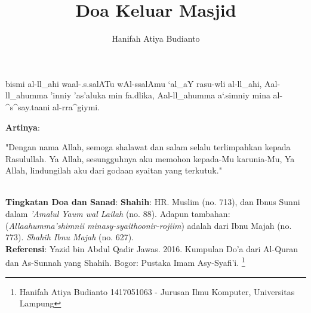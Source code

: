 \documentclass[a4paper,12pt]{article}
\title{\Large Doa Keluar Masjid}
\author{\calligra Hanifah Atiya Budianto}
\begin{document}
\sffamily
\maketitle 
\fullvocalize
{}
\begin{arabtext}
\noindent
bismi al-ll_ahi waal-.s.salATu wAl-ssalAmu `al_aY rasu-wli  al-ll_ahi, 
Aal-ll_ahumma 'inniy 'as'aluka min fa.dlika, Aal-ll_ahumma a`.simniy mina 
al-^s^say.taani al-rra^giymi.\\
\end{arabtext}
\noindent
\textbf{Artinya}:
\par
\indent
"Dengan nama Allah, semoga shalawat dan salam selalu terlimpahkan kepada 
Rasulullah. Ya Allah, sesungguhnya aku memohon kepada-Mu karunia-Mu, Ya 
Allah, lindungilah aku dari godaan syaitan yang terkutuk."\\\\
\par
\noindent
\textbf{Tingkatan Doa dan Sanad}: \textbf{Shahih}: HR. Muslim (no. 713), 
dan Ibnus Sunni dalam \textit{'Amalul Yaum wal Lailah} (no. 88). Adapun 
tambahan: (\textit{Allaahumma'shimnii minasy-syaithoonir-rojiim}) adalah 
dari Ibnu Majah (no. 773). \textit{Shah\^{i}h Ibnu Majah} (no. 627).\\
\textbf{Referensi}: Yazid bin Abdul Qadir Jawas. 2016. Kumpulan Do'a dari
Al-Quran dan As-Sunnah yang Shahih. Bogor: Pustaka Imam Asy-Syafi'i.
\footnote{Hanifah Atiya Budianto 1417051063 - Jurusan Ilmu Komputer,
Universitas Lampung}
\end{document}
